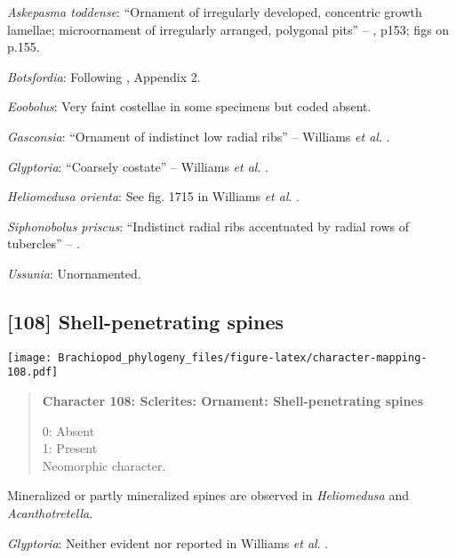 \documentclass[openany]{book}
\theoremstyle{definition}
\theoremstyle{definition}
\theoremstyle{definition}
\theoremstyle{remark}
\begin{document}
\hypertarget{Askepasma_toddense-coding-107}{}
\emph{Askepasma toddense}: ``Ornament of irregularly developed,
concentric growth lamellae; microornament of irregularly arranged,
polygonal pits'' -- \citet{Williams2000LinguliformeaCraniiformea}, p153;
figs on p.155.

\hypertarget{Botsfordia-coding-107}{}
\emph{Botsfordia}: Following \citet{Williams1998Thediversity}, Appendix
2.

\hypertarget{Eoobolus-coding-107}{}
\emph{Eoobolus}: Very faint costellae in some specimens but coded
absent.

\hypertarget{Gasconsia-coding-107}{}
\emph{Gasconsia}: ``Ornament of indistinct low radial ribs'' -- Williams
\emph{et al}. \citeyearpar[p167]{Williams2000LinguliformeaCraniiformea}.

\hypertarget{Glyptoria-coding-107}{}
\emph{Glyptoria}: ``Coarsely costate'' -- Williams \emph{et al}.
\citeyearpar[p710]{Williams2000LinguliformeaCraniiformea}.

\hypertarget{Heliomedusa_orienta-coding-107}{}
\emph{Heliomedusa orienta}: See fig. 1715 in Williams \emph{et al}.
\citeyearpar{Williams2007Supplement}.

\hypertarget{Siphonobolus_priscus-coding-107}{}
\emph{Siphonobolus priscus}: ``Indistinct radial ribs accentuated by
radial rows of tubercles'' -- \citet{Popov2009Earlyontogeny}.

\hypertarget{Ussunia-coding-107}{}
\emph{Ussunia}: Unornamented.

\subsection*{{[}108{]} Shell-penetrating
spines}\label{shell-penetrating-spines}

\texttt{[image: Brachiopod\_phylogeny\_files/figure-latex/character-mapping-108.pdf]}

\begin{quote}
\textbf{Character 108: Sclerites: Ornament: Shell-penetrating spines}

0: Absent\\
1: Present\\
Neomorphic character.
\end{quote}

Mineralized or partly mineralized spines are observed in
\emph{Heliomedusa} and \emph{Acanthotretella}.

\hypertarget{Glyptoria-coding-108}{}
\emph{Glyptoria}: Neither evident nor reported in Williams \emph{et al}.
\citeyearpar{Williams2000LinguliformeaCraniiformea}.
\end{document}
